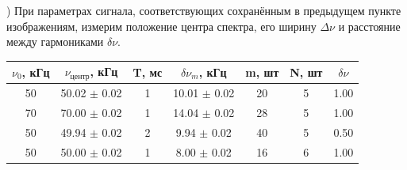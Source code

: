 \documentclass[a4paper,12pt]{article}
\begin{document}
) При параметрах сигнала, соответствующих сохранённым в предыдущем пункте изображениям, измерим положение центра спектра, его ширину $\Delta\nu$ и расстояние между гармониками $\delta\nu$.

\begin{center}
\begin{tabular}{|c|c|c|c|c|c|c|}
	\hline
	$\nu_0$, кГц & $\nu_{\text{центр}}$, кГц & T, мс & $\delta\nu_m$, кГц & m, шт & N, шт & $\delta\nu$ \\
	\hline
	50 & 50.02 $\pm$ 0.02 & 1 & 10.01 $\pm$ 0.02 & 20 & 5 & 1.00 \\
	\hline
	70 & 70.00 $\pm$ 0.02 & 1 & 14.04 $\pm$ 0.02 & 28 & 5 & 1.00  \\
	\hline
	50 & 49.94 $\pm$ 0.02 & 2 & 9.94 $\pm$ 0.02 & 40 & 5 & 0.50 \\
	\hline
	50 & 50.00 $\pm$ 0.02 & 1 & 8.00 $\pm$ 0.02 & 16 & 6 & 1.00 \\
	\hline
\end{tabular}
\end{center}
\end{document}
